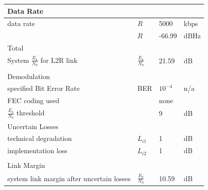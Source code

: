 \begin{table}[]
\begin{tabular}{llll}
\multicolumn{4}{l}{\cellcolor[HTML]{DAE8FC}Data Rate}                            \\ \hline
data rate                                 &${R}$			& 5000                   & kbps \\
                                          &${R}$			& -66.99                 & dBHz \\ \hline
\multicolumn{4}{l}{\cellcolor[HTML]{DAE8FC}Total}                                \\ \hline
System $\frac{{E}_{b}}{{N}_{0}}$ for L2R link &$\frac{{E}_{b}}{{N}_{0}}$& 21.59                  & dB   \\
\multicolumn{4}{l}{}                                                             \\ \hline
\multicolumn{4}{l}{\cellcolor[HTML]{DAE8FC}Demodulation}                         \\ \hline
specified Bit Error Rate                  &BER      		& $10^{-4}$ 				 & n/a  \\
FEC coding used                           &      		& none                   &      \\
$\frac{{E}_{b}}{{N}_{0}}$ threshold       &      		& 9                      & dB   \\ \hline
\multicolumn{4}{l}{\cellcolor[HTML]{DAE8FC}Uncertain Losses}                     \\ \hline
technical degradation                     &${L}_{i1}$	& 1                      & dB   \\
implementation loss                       &${L}_{i2}$	& 1                      & dB   \\
\multicolumn{4}{l}{}                                                             \\ \hline
\multicolumn{4}{l}{\cellcolor[HTML]{DAE8FC}Link Margin}                          \\ \hline
system link margin after uncertain losses &$\frac{{E}_{b}}{{N}_{0}}$& 10.59                  & dB  
\end{tabular}
\end{table}

